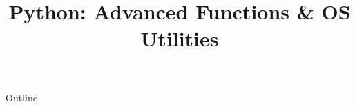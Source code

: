 \documentclass[xcolor=dvipsnames,compress,t,pdf]{beamer}
\title[\insertframenumber /\inserttotalframenumber]{Python: Advanced Functions \& OS Utilities}
\begin{document}
	\begin{frame}
	\titlepage
	\end{frame}

	\begin{frame}{Outline}
	    \tableofcontents
	\end{frame}

	
	
	
\end{document}
